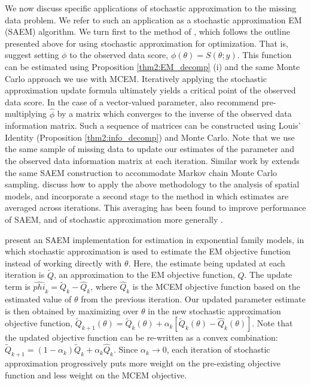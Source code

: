 \documentclass[11pt, oneside]{article}   	%
\begin{document}
We now discuss specific applications of stochastic approximation to the missing data problem. We refer to such an application as a stochastic approximation EM (SAEM) algorithm. We turn first to the method of \citet{Gu98I}, which follows the outline presented above for using stochastic approximation for optimization. That is, \citeauthor{Gu98I} suggest setting $\phi$ to the observed data score, $\phi(\theta) = S(\theta; y)$. This function can be estimated using Proposition \ref{thm2:EM_decomp} (i) and the same Monte Carlo approach we use with MCEM. Iteratively applying the stochastic approximation update formula ultimately yields a critical point of the observed data score. In the case of a vector-valued parameter, \citeauthor{Gu98I} also recommend pre-multiplying $\hat{\phi}$ by a matrix which converges to the inverse of the observed data information matrix. Such a sequence of matrices can be constructed using Louis' Identity (Proposition \ref{thm2:info_decomp}) and Monte Carlo. Note that we use the same sample of missing data to update our estimates of the parameter and the observed data information matrix at each iteration. Similar work by \citet{Gu98II} extends the same SAEM construction to accommodate Markov chain Monte Carlo sampling. \citet{Gu01} discuss how to apply the above methodology to the analysis of spatial models, and incorporate a second stage to the method in which estimates are averaged across iterations. This averaging has been found to improve performance of SAEM, and of stochastic approximation more generally \citep{Pol92, Del99}.

\citet{Dey99} present an SAEM implementation for estimation in exponential family models, in which stochastic approximation is used to estimate the EM objective function instead of working directly with $\theta$. Here, the estimate being updated at each iteration is $\tilde{Q}$, an approximation to the EM objective function, $Q$. The update term is $\hat{phi}_k = \tilde{Q}_k - \hat{Q}_k$, where $\hat{Q}_k$ is the MCEM objective function based on the estimated value of $\theta$ from the previous iteration. Our updated parameter estimate is then obtained by maximizing over $\theta$ in the new stochastic approximation objective function, $\tilde{Q}_{k+1}(\theta) = \tilde{Q}_k(\theta) + \alpha_k [ \tilde{Q}_k(\theta) - \hat{Q}_k(\theta)]$. Note that the updated objective function can be re-written as a convex combination: $\tilde{Q}_{k+1} = (1 - \alpha_k) \tilde{Q}_k + \alpha_k \hat{Q}_k$. Since $\alpha_k \rightarrow 0$, each iteration of stochastic approximation progressively puts more weight on the pre-existing objective function and less weight on the MCEM objective.
\end{document}
